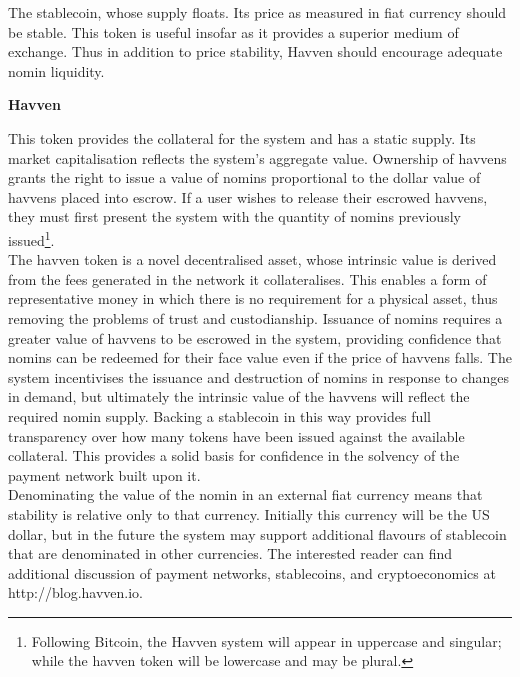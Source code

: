 \noindent The stablecoin, whose supply floats. Its price as measured in fiat
currency should be stable. This token is useful insofar as it provides a
superior medium of exchange. Thus in addition to price stability, Havven
should encourage adequate nomin liquidity.

\vspace{2mm}

\noindent \textbf{Havven}

\vspace{1mm}

\noindent This token provides the collateral for the system and has a static
supply. Its market capitalisation reflects the system’s aggregate value.
Ownership of havvens grants the right to issue a value of nomins proportional
to the dollar value of havvens placed into escrow. If a user wishes to
release their escrowed havvens, they must first present the system with the
quantity of nomins previously issued\footnote{Following Bitcoin, the Havven
system will appear in uppercase and singular; while the havven token will be
lowercase and may be plural.}. \\

\noindent The havven token is a novel decentralised asset, whose intrinsic
value is derived from the fees generated in the network it collateralises.
This enables a form of representative money in which there is no requirement
for a physical asset, thus removing the problems of trust and custodianship.
Issuance of nomins requires a greater value of havvens to be escrowed in the
system, providing confidence that nomins can be redeemed for their face value
even if the price of havvens falls. The system incentivises the issuance and
destruction of nomins in response to changes in demand, but ultimately the
intrinsic value of the havvens will reflect the required nomin supply.
Backing a stablecoin in this way provides full transparency over how many
tokens have been issued against the available collateral. This provides a
solid basis for confidence in the solvency of the payment network built upon
it.\\

\noindent Denominating the value of the nomin in an external fiat currency
means that stability is relative only to that currency. Initially this
currency will be the US dollar, but in the future the system may support
additional flavours of stablecoin that are denominated in other currencies.
The interested reader can find additional discussion of payment networks,
stablecoins, and cryptoeconomics at http://blog.havven.io.\pagebreak
